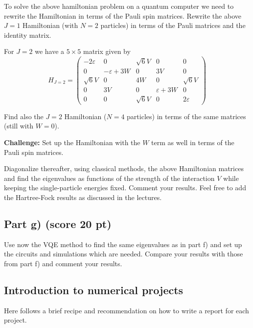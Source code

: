 \documentclass[%
oneside,                 %
final,                   %
10pt]{article}
\begin{document}
To solve the above hamiltonian problem on a quantum computer we need
to rewrite the Hamiltonian in terms of the Pauli spin
matrices. Rewrite the above $J=1$ Hamiltonian (with $N=2$ particles)
in terms of the Pauli matrices and the identity matrix.

For $J=2$ we have a $5\times 5$ matrix given by
\begin{equation}
H_{J = 2} =
\begin{pmatrix}
-2\varepsilon & 0 & \sqrt{6}V & 0 & 0 \\
0 & -\varepsilon + 3W & 0 & 3V & 0 \\
\sqrt{6}V & 0 & 4W & 0 & \sqrt{6}V \\
0 & 3V & 0 & \varepsilon + 3W & 0 \\
0 & 0 & \sqrt{6}V & 0 & 2\varepsilon
\end{pmatrix}
\end{equation}

Find also the $J=2$ Hamiltonian ($N=4$ particles) in terms of the same matrices (still with $W=0$).

\textbf{Challenge:} Set up the Hamiltonian with the $W$ term as well in terms of the Pauli spin matrices.

Diagonalize thereafter, using classical methods, the above Hamiltonian matrices and find the
eigenvalues as functions of the strength of the interaction $V$ while
keeping the single-particle energies fixed. Comment your results. Feel
free to add the Hartree-Fock results as discussed in the lectures.

\subsection*{Part g) (score 20 pt)}

Use now the VQE method to find the same eigenvalues as in part f) and
set up the circuits and simulations which are needed. Compare your
results with those from part f) and comment your results.

\subsection*{Introduction to numerical projects}

Here follows a brief recipe and recommendation on how to write a report for each
project.
\end{document}
